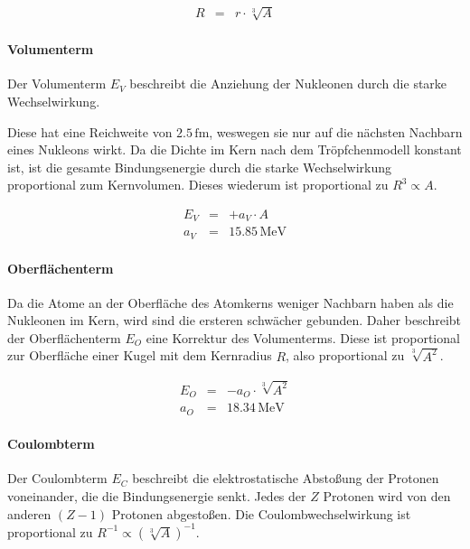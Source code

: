 \documentclass[12pt,a4paper]{scrartcl}
\numberwithin{equation}{section} %
\begin{document}
\begin{eqnarray}
	R &=& r \cdot \sqrt[3]{A}
\end{eqnarray}

\hypertarget{volumenterm}{%
	\paragraph{Volumenterm}\label{volumenterm}}

Der Volumenterm $E_V$ beschreibt die Anziehung der Nukleonen durch die starke Wechselwirkung.

Diese hat eine Reichweite von $2.5\mathrm{\,fm}$, weswegen sie nur auf die nächsten Nachbarn eines Nukleons wirkt. Da die Dichte im Kern nach dem Tröpfchenmodell konstant ist, ist die gesamte Bindungsenergie durch die starke Wechselwirkung proportional zum Kernvolumen. Dieses wiederum ist proportional zu $R^3\propto A$.

\begin{eqnarray}
	E_V &=& + a_V\cdot A \label{Volumenterm} \\
	a_V &=& 15.85\mathrm{\,MeV}
\end{eqnarray}

\hypertarget{oberfluxe4chenterm}{%
	\paragraph{Oberflächenterm}\label{oberfluxe4chenterm}}

Da die Atome an der Oberfläche des Atomkerns weniger Nachbarn haben als die Nukleonen im Kern, wird sind die ersteren schwächer gebunden. Daher beschreibt der Oberflächenterm $E_O$ eine Korrektur des Volumenterms. Diese ist proportional zur Oberfläche einer Kugel mit dem Kernradius $R$, also proportional zu $\sqrt[3]{A^2}$.

\begin{eqnarray}
	E_O &=& - a_O\cdot \sqrt[3]{A^2} \label{Oberflächenterm} \\
	a_O &=& 18.34\mathrm{\,MeV}
\end{eqnarray}

\hypertarget{coulombterm}{%
	\paragraph{Coulombterm}\label{coulombterm}}

Der Coulombterm $E_C$ beschreibt die elektrostatische Abstoßung der Protonen voneinander, die die Bindungsenergie senkt. Jedes der $Z$ Protonen wird von den anderen $(Z-1)$ Protonen abgestoßen. Die Coulombwechselwirkung ist proportional zu $R^{-1}\propto\left(\sqrt[3]{A}\right)^{-1}$.
\end{document}
